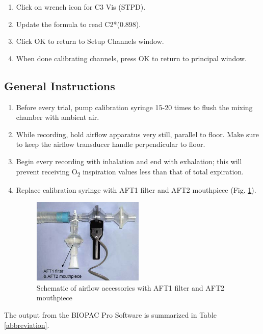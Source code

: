 \documentclass{article}
\begin{document}
\begin{enumerate}
\begin{enumerate}
		\item Click on wrench icon for C3 Vis (STPD).
		\item Update the formula to read C2*(0.898).
		\item Click OK to return to Setup Channels window.
		\item When done calibrating channels, press OK to return to principal window.
	\end{enumerate}
\end{enumerate}

\subsection{General Instructions}
\begin{enumerate}
	\item Before every trial, pump calibration syringe 15-20 times to flush the mixing chamber with ambient air.
	\item While recording, hold airflow apparatus very still, parallel to floor. Make sure to keep the airflow transducer handle perpendicular to floor.
	\item Begin every recording with inhalation and end with exhalation; this will prevent receiving O\textsubscript{2} inspiration values less than that of total expiration.
	\item Replace calibration syringe with AFT1 filter and AFT2 mouthpiece (Fig. \ref{aft3}).\begin{figure}[h]
	\centering\includegraphics[width=0.5\textwidth]{../images/BMR_6.jpg}
		\caption{Schematic of airflow accessories with AFT1 filter and AFT2 mouthpiece}
		\label{aft3}
		\end{figure}
\end{enumerate}

The output from the BIOPAC Pro Software is summarized in Table \ref{abbreviation}.
\end{document}

